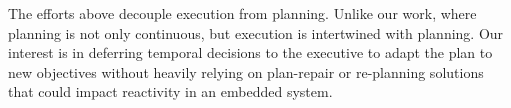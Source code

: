 The efforts above decouple execution from planning. Unlike our work,
where planning is not only continuous, but execution is intertwined
with planning. Our interest is in deferring temporal decisions to the
executive to adapt the plan to new objectives without heavily relying
on plan-repair or re-planning solutions that could impact reactivity
in an embedded system. 




